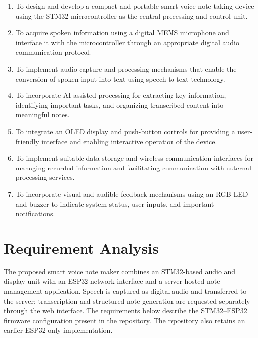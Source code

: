 \documentclass[a4paper,12pt,oneside]{report}
\begin{document}
\begin{enumerate}
    \item To design and develop a compact and portable smart
    voice note-taking device using the STM32 microcontroller
    as the central processing and control unit.

    \item To acquire spoken information using a digital MEMS
    microphone and interface it with the microcontroller
    through an appropriate digital audio communication protocol.

    \item To implement audio capture and processing mechanisms
    that enable the conversion of spoken input into text
    using speech-to-text technology.

    \item To incorporate AI-assisted processing for extracting
    key information, identifying important tasks, and organizing
    transcribed content into meaningful notes.

    \item To integrate an OLED display and push-button controls
    for providing a user-friendly interface and enabling
    interactive operation of the device.

    \item To implement suitable data storage and wireless
    communication interfaces for managing recorded information
    and facilitating communication with external processing
    services.

    \item To incorporate visual and audible feedback mechanisms
    using an RGB LED and buzzer to indicate system status,
    user inputs, and important notifications.
\end{enumerate}



\chapter{Requirement Analysis}
\label{ch:requirements}

The proposed smart voice note maker combines an STM32-based audio and display unit with an ESP32 network interface and a server-hosted note management application. Speech is captured as digital audio and transferred to the server; transcription and structured note generation are requested separately through the web interface. The requirements below describe the STM32--ESP32 firmware configuration present in the repository. The repository also retains an earlier ESP32-only implementation.
\end{document}

